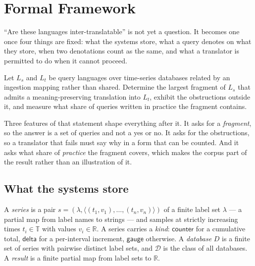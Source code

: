 
\section{Formal Framework}
\label{s:sec:framework}

``Are these languages inter-translatable'' is not yet a question. It becomes one once
four things are fixed: what the systems store, what a query denotes on what they store,
when two denotations count as the same, and what a translator is permitted to do when it
cannot proceed.

\begin{problem}
Let $L_s$ and $L_t$ be query languages over time-series databases related by an
ingestion mapping rather than shared. Determine the largest fragment of $L_s$ that admits
a meaning-preserving translation into $L_t$, exhibit the obstructions outside it, and
measure what share of queries written in practice the fragment contains.
\end{problem}

\noindent
Three features of that statement shape everything after it. It asks for a
\emph{fragment}, so the answer is a set of queries and not a yes or no. It asks for the
obstructions, so a translator that fails must say why in a form that can be counted. And
it asks what share of \emph{practice} the fragment covers, which makes the corpus part of
the result rather than an illustration of it.

\subsection{What the systems store}

\begin{definition}\label{s:def:model}
A \emph{series} is a pair $s=(\lambda,\langle (t_1,v_1),\dots,(t_n,v_n)\rangle)$ of a
finite label set $\lambda$ --- a partial map from label names to strings --- and samples
at strictly increasing times $t_i\in\mathbb{T}$ with values $v_i\in\mathbb{R}$. A series
carries a \emph{kind}: $\mathsf{counter}$ for a cumulative total, $\mathsf{delta}$ for a
per-interval increment, $\mathsf{gauge}$ otherwise. A \emph{database} $D$ is a finite set
of series with pairwise distinct label sets, and $\mathcal{D}$ is the class of all
databases. A \emph{result} is a finite partial map from label sets to $\mathbb{R}$.
\end{definition}

